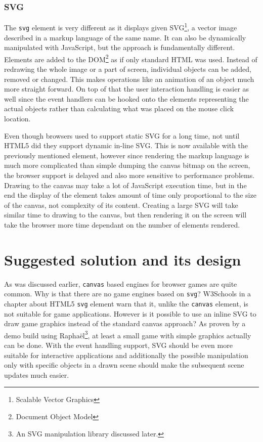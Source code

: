 \documentclass[11pt,oneside, final]{fithesis2}
\begin{document}
\subsection{SVG}
The \texttt{svg} element is very different as it displays given SVG\footnote{Scalable Vector Graphics}, a vector image described in a markup language of the same name. It can also be dynamically manipulated with JavaScript, but the approach is fundamentally different. Elements are added to the DOM\footnote{Document Object Model} as if only standard HTML was used. Instead of redrawing the whole image or a part of screen, individual objects can be added, removed or changed. This makes operations like an animation of an object much more straight forward. On top of that the user interaction handling is easier as well since the event handlers can be hooked onto the elements representing the actual objects rather than calculating what was placed on the mouse click location.

Even though browsers used to support static SVG for a long time, not until HTML5 did they support dynamic in-line SVG\cite{w3_html5}. This is now available with the previously mentioned element, however since rendering the markup language is much more complicated than simple dumping the canvas bitmap on the screen, the browser support is delayed and also more sensitive to performance problems. Drawing to the canvas may take a lot of JavaScript execution time, but in the end the display of the element takes amount of time only proportional to the size of the canvas, not complexity of its content. Creating a large SVG will take similar time to drawing to the canvas, but then rendering it on the screen will take the browser more time dependant on the number of elements rendered.

\chapter{Suggested solution and its design}
\label{solution}
As was discussed earlier, \texttt{canvas} based engines for browser games are quite common. Why is that there are no game engines based on \texttt{svg}? W3Schools in a chapter about HTML5 \texttt{svg} element warn that it, unlike the \texttt{canvas} element, is not suitable for game applications\cite{html5svg}. However is it possible to use an inline SVG to draw game graphics instead of the standard canvas approach? As proven by a demo build using Raphaël\footnote{An SVG manipulation library discussed later.}, at least a small game with simple graphics actually can be done\cite{raphaelfpsdemo}. With the event handling support, SVG should be even more suitable for interactive applications and additionally the possible manipulation only with specific objects in a drawn scene should make the subsequent scene updates much easier.
\end{document}
